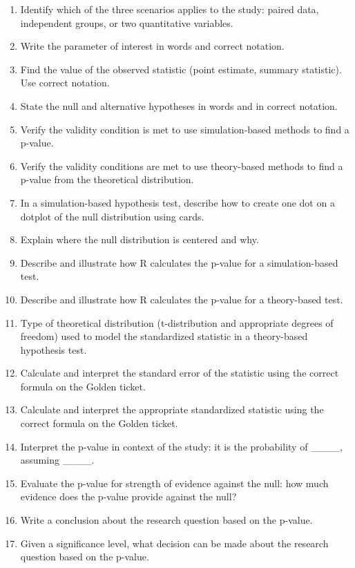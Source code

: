 \documentclass[
]{report}
\begin{document}
\begin{enumerate}
\def\labelenumi{\arabic{enumi}.}
\setcounter{enumi}{12}
\item
  Identify which of the three scenarios applies to the study: paired data, independent groups, or two quantitative variables.
\item
  Write the parameter of interest in words and correct notation.
\item
  Find the value of the observed statistic (point estimate, summary statistic). Use correct notation.
\item
  State the null and alternative hypotheses in words and in correct notation.
\item
  Verify the validity condition is met to use simulation-based methods to find a p-value.
\item
  Verify the validity conditions are met to use theory-based methods to find a p-value from the theoretical distribution.
\item
  In a simulation-based hypothesis test, describe how to create one dot on a dotplot of the null distribution using cards.
\item
  Explain where the null distribution is centered and why.
\item
  Describe and illustrate how R calculates the p-value for a simulation-based test.
\item
  Describe and illustrate how R calculates the p-value for a theory-based test.
\item
  Type of theoretical distribution (t-distribution and appropriate degrees of freedom) used to model the standardized statistic in a theory-based hypothesis test.
\item
  Calculate and interpret the standard error of the statistic using the correct formula on the Golden ticket.
\item
  Calculate and interpret the appropriate standardized statistic using the correct formula on the Golden ticket.
\item
  Interpret the p-value in context of the study: it is the probability of \_\_\_\_, assuming \_\_\_\_.
\item
  Evaluate the p-value for strength of evidence against the null: how much evidence does the p-value provide against the null?
\item
  Write a conclusion about the research question based on the p-value.
\item
  Given a significance level, what decision can be made about the research question based on the p-value.
\end{enumerate}
\end{document}

